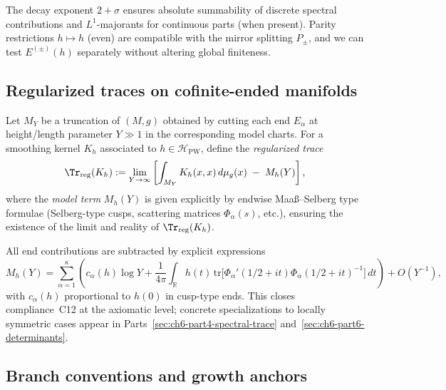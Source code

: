 \begin{remark}
\label{rem:uniformity}
The decay exponent $2+\sigma$ ensures absolute summability of discrete spectral contributions and $L^1$-majorants for continuous parts (when present). Parity restrictions $h\mapsto h$ (even) are compatible with the mirror splitting $P_\pm$, and we can test $E^{(\pm)}(h)$ separately without altering global finiteness. %
\end{remark}

\subsection{Regularized traces on cofinite-ended manifolds}
\label{subsec:ch6-part1-regtrace} \relax

\begin{definition}
\label{def:truncation}
Let $M_Y$ be a truncation of $(M,g)$ obtained by cutting each end $E_\alpha$ at height/length parameter $Y\gg 1$ in the corresponding model charts. For a smoothing kernel $K_h$ associated to $h\in\mathcal{H}_{\mathrm{PW}}$, define the \emph{regularized trace}
\[
\Tr_{\mathrm{reg}}(K_h)
:= \lim_{Y\to\infty}\left[\int_{M_Y} K_h(x,x)\,d\mu_g(x)\;-\;M_h(Y)\right],
\]
where the \emph{model term} $M_h(Y)$ is given explicitly by endwise Maaß–Selberg type formulae (Selberg-type cusps, scattering matrices $\Phi_\alpha(s)$, etc.), ensuring the existence of the limit and reality of $\Tr_{\mathrm{reg}}(K_h)$. %
\end{definition}

\begin{remark}
\label{rem:C12-lock}
All end contributions are subtracted by explicit expressions
\[
M_h(Y)=\sum_{\alpha=1}^\kappa \left( c_\alpha(h)\log Y + \frac{1}{4\pi}\int_{\mathbb{R}} h(t)\,\mathrm{tr}\big[\Phi_\alpha'(1/2+it)\Phi_\alpha(1/2+it)^{-1}\big]\,dt \right)+O(Y^{-1}),
\]
with $c_\alpha(h)$ proportional to $h(0)$ in cusp-type ends. This closes compliance~C12 at the axiomatic level; concrete specializations to locally symmetric cases appear in Parts~\ref{sec:ch6-part4-spectral-trace} and~\ref{sec:ch6-part6-determinants}. %
\end{remark}

\subsection{Branch conventions and growth anchors}
\label{subsec:ch6-part1-branch-growth} \relax

